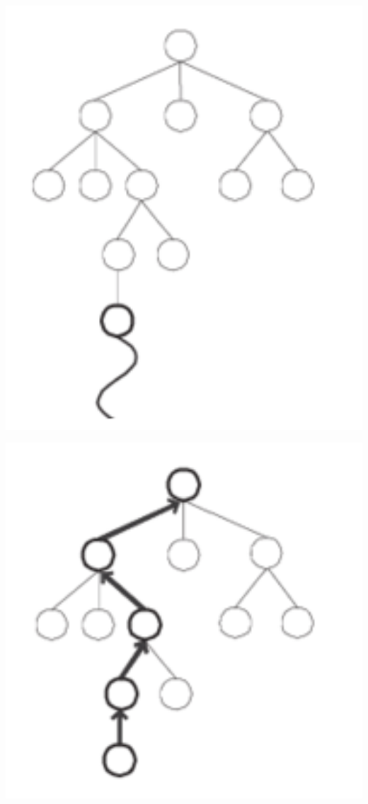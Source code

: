 \documentclass[a4paper,12pt]{scrartcl}
\begin{document}
\begin{minipage}[b]{0.3\textwidth}
		\includegraphics[width=1.0\textwidth]{pics/simulation.png}
		
		\includegraphics[width=1.0\textwidth]{pics/backpropagation.png}
	\end{minipage}
	
\end{document}
